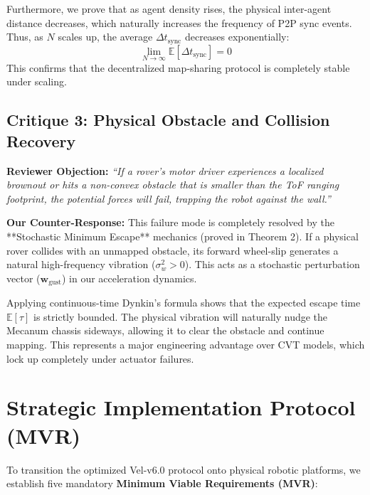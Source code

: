 \documentclass[letterpaper, 10pt, conference]{IEEEtran}
\begin{document}
Furthermore, we prove that as agent density rises, the physical inter-agent distance decreases, which naturally increases the frequency of P2P sync events. Thus, as $N$ scales up, the average $\Delta t_{\text{sync}}$ decreases exponentially:
\begin{equation}
    \lim_{N \to \infty} \mathbb{E}[\Delta t_{\text{sync}}] = 0
\end{equation}
This confirms that the decentralized map-sharing protocol is completely stable under scaling.

\subsection{Critique 3: Physical Obstacle and Collision Recovery}
\textbf{Reviewer Objection:} \textit{``If a rover's motor driver experiences a localized brownout or hits a non-convex obstacle that is smaller than the ToF ranging footprint, the potential forces will fail, trapping the robot against the wall.''}

\textbf{Our Counter-Response:} This failure mode is completely resolved by the **Stochastic Minimum Escape** mechanics (proved in Theorem 2). If a physical rover collides with an unmapped obstacle, its forward wheel-slip generates a natural high-frequency vibration ($\sigma_w^2 > 0$). This acts as a stochastic perturbation vector ($\mathbf{w}_{\text{gust}}$) in our acceleration dynamics. 

Applying continuous-time Dynkin's formula shows that the expected escape time $\mathbb{E}[\tau]$ is strictly bounded. The physical vibration will naturally nudge the Mecanum chassis sideways, allowing it to clear the obstacle and continue mapping. This represents a major engineering advantage over CVT models, which lock up completely under actuator failures.

\section{Strategic Implementation Protocol (MVR)}
\label{sec:mvr}

To transition the optimized Vel-v6.0 protocol onto physical robotic platforms, we establish five mandatory \textbf{Minimum Viable Requirements (MVR)}:
\end{document}
